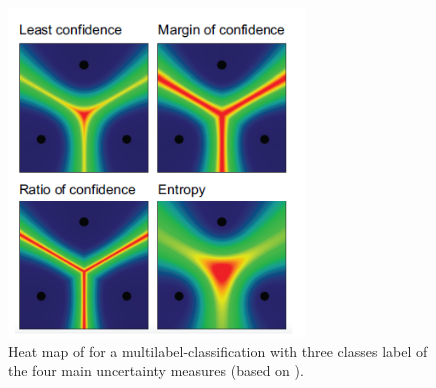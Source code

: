 \begin{figure}[t]
  \centering
    \includegraphics[width=0.70\textwidth]{figures/uncertainty_sampling_heatmap.PNG}
  \caption{ Heat map of for a multilabel-classification with three classes label of the four main uncertainty measures (based on \cite{human-in-the-loop}).}
  \label{fig:uncertainty_sampling_heatmap}
\end{figure}